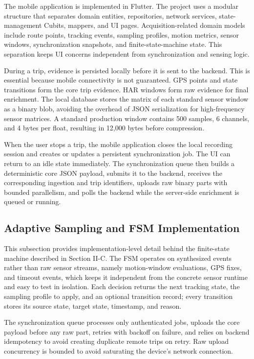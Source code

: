 \documentclass[conference,a4paper]{IEEEtran}
\begin{document}
The mobile application is implemented in Flutter. The project uses a modular structure that separates domain entities, repositories, network services, state-management Cubits, mappers, and UI pages. Acquisition-related domain models include route points, tracking events, sampling profiles, motion metrics, sensor windows, synchronization snapshots, and finite-state-machine state. This separation keeps UI concerns independent from synchronization and sensing logic.

During a trip, evidence is persisted locally before it is sent to the backend. This is essential because mobile connectivity is not guaranteed. GPS points and state transitions form the core trip evidence. HAR windows form raw evidence for final enrichment. The local database stores the matrix of each standard sensor window as a binary blob, avoiding the overhead of JSON serialization for high-frequency sensor matrices. A standard production window contains 500 samples, 6 channels, and 4 bytes per float, resulting in 12,000 bytes before compression.

When the user stops a trip, the mobile application closes the local recording session and creates or updates a persistent synchronization job. The UI can return to an idle state immediately. The synchronization queue then builds a deterministic core JSON payload, submits it to the backend, receives the corresponding ingestion and trip identifiers, uploads raw binary parts with bounded parallelism, and polls the backend while the server-side enrichment is queued or running.

\subsection{Adaptive Sampling and FSM Implementation}

This subsection provides implementation-level detail behind the finite-state machine described in Section II-C. The FSM operates on synthesized events rather than raw sensor streams, namely motion-window evaluations, GPS fixes, and timeout events, which keeps it independent from the concrete sensor runtime and easy to test in isolation. Each decision returns the next tracking state, the sampling profile to apply, and an optional transition record; every transition stores its source state, target state, timestamp, and reason.

The synchronization queue processes only authenticated jobs, uploads the core payload before any raw part, retries with backoff on failure, and relies on backend idempotency to avoid creating duplicate remote trips on retry. Raw upload concurrency is bounded to avoid saturating the device's network connection.
\end{document}
